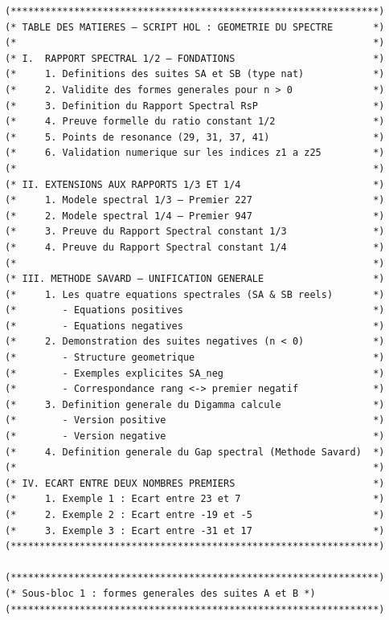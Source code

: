 \documentclass[a4paper,11pt]{article}
\begin{document}
\begin{holcode}[title={\textcolor{white}{File: methode\_spectral.thy -- Part 1/4}}]
\begin{lstlisting}
(****************************************************************)
(* TABLE DES MATIERES – SCRIPT HOL : GEOMETRIE DU SPECTRE       *)
(*                                                              *)
(* I.  RAPPORT SPECTRAL 1/2 – FONDATIONS                        *)
(*     1. Definitions des suites SA et SB (type nat)            *)
(*     2. Validite des formes generales pour n > 0              *)
(*     3. Definition du Rapport Spectral RsP                    *)
(*     4. Preuve formelle du ratio constant 1/2                 *)
(*     5. Points de resonance (29, 31, 37, 41)                  *)
(*     6. Validation numerique sur les indices z1 a z25         *)
(*                                                              *)
(* II. EXTENSIONS AUX RAPPORTS 1/3 ET 1/4                       *)
(*     1. Modele spectral 1/3 – Premier 227                     *)
(*     2. Modele spectral 1/4 – Premier 947                     *)
(*     3. Preuve du Rapport Spectral constant 1/3               *)
(*     4. Preuve du Rapport Spectral constant 1/4               *)
(*                                                              *)
(* III. METHODE SAVARD – UNIFICATION GENERALE                   *)
(*     1. Les quatre equations spectrales (SA & SB reels)       *)
(*        - Equations positives                                 *)
(*        - Equations negatives                                 *)
(*     2. Demonstration des suites negatives (n < 0)            *)
(*        - Structure geometrique                               *)
(*        - Exemples explicites SA_neg                          *)
(*        - Correspondance rang <-> premier negatif             *)
(*     3. Definition generale du Digamma calcule                *)
(*        - Version positive                                    *)
(*        - Version negative                                    *)
(*     4. Definition generale du Gap spectral (Methode Savard)  *)
(*                                                              *)
(* IV. ECART ENTRE DEUX NOMBRES PREMIERS                        *)
(*     1. Exemple 1 : Ecart entre 23 et 7                       *)
(*     2. Exemple 2 : Ecart entre -19 et -5                     *)
(*     3. Exemple 3 : Ecart entre -31 et 17                     *)
(****************************************************************)

(****************************************************************)
(* Sous-bloc 1 : formes generales des suites A et B *)
(****************************************************************)


\end{lstlisting}
\end{holcode}
\end{document}
